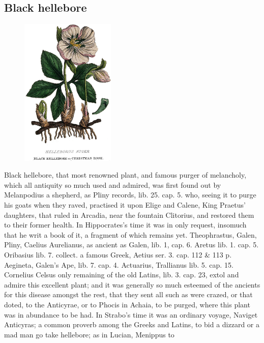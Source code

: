 {\subsection{Black hellebore}
\begin{figure}
\includegraphics[keepaspectratio,width=0.4\textwidth]{figures/Helleborus-Niger-small.jpg}
\caption{}
\label{fig:helleborusniger2}
\end{figure}
Black hellebore, that most renowned plant, and famous purger of
melancholy, which all antiquity so much used and admired, was first
found out by Melanpodius a shepherd, as Pliny records, lib. 25. cap. 5.
who, seeing it to purge his goats when they raved, practised it
upon Elige and Calene, King Praetus' daughters, that ruled in Arcadia,
near the fountain Clitorius, and restored them to their former health.
In Hippocrates's time it was in only request, insomuch that he writ a
book of it, a fragment of which remains yet. Theophrastus, Galen,
Pliny, Caelius Aurelianus, as ancient as Galen, lib. 1, cap. 6. Aretus
lib. 1. cap. 5. Oribasius lib. 7. collect. a famous Greek, Aetius ser.
3. cap. 112 \& 113 p. Aegineta, Galen's Ape, lib. 7. cap. 4. Actuarius,
Trallianus lib. 5. cap. 15. Cornelius Celsus only remaining of the old
Latins, lib. 3. cap. 23, extol and admire this excellent plant; and it
was generally so much esteemed of the ancients for this disease amongst
the rest, that they sent all such as were crazed, or that doted, to the
Anticyrae, or to Phocis in Achaia, to be purged, where this plant was
in abundance to be had. In Strabo's time it was an ordinary voyage,
Naviget Anticyras; a common proverb among the Greeks and Latins, to bid
a dizzard or a mad man go take hellebore; as in Lucian, Menippus to
}
